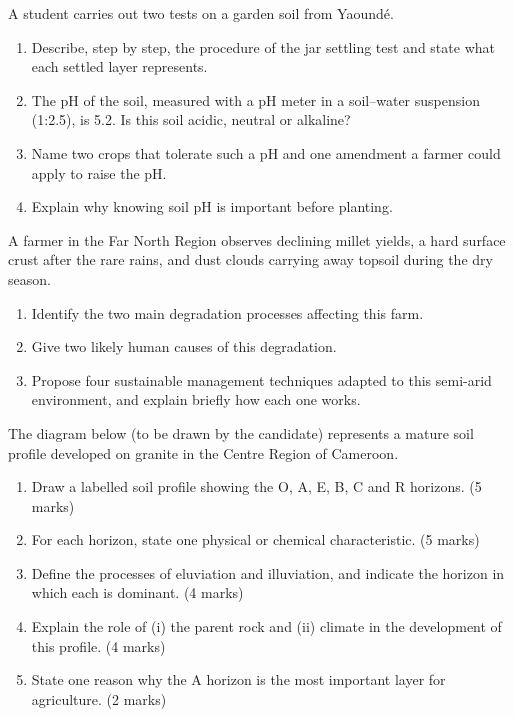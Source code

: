 \documentclass[11pt]{article}
\newcounter{popsec}
\newcounter{popsub}
\newcommand{\courssub}[1]{%
  \stepcounter{popsub}%
  \par\vspace{9pt}\noindent{\popxbold\fontsize{11.5}{13}\selectfont\color{popink}{\color{poporange}\thepopsec.\thepopsub}\hspace{6pt}#1}\par\nopagebreak\vspace{4pt}
}
\begin{document}
\begin{exercice}
A student carries out two tests on a garden soil from Yaoundé.
\begin{enumerate}
\item Describe, step by step, the procedure of the jar settling test and state what each settled layer represents.
\item The pH of the soil, measured with a pH meter in a soil--water suspension (1:2.5), is 5.2. Is this soil acidic, neutral or alkaline?
\item Name two crops that tolerate such a pH and one amendment a farmer could apply to raise the pH.
\item Explain why knowing soil pH is important before planting.
\end{enumerate}
\end{exercice}

\begin{exercice}
A farmer in the Far North Region observes declining millet yields, a hard surface crust after the rare rains, and dust clouds carrying away topsoil during the dry season.
\begin{enumerate}
\item Identify the two main degradation processes affecting this farm.
\item Give two likely human causes of this degradation.
\item Propose four sustainable management techniques adapted to this semi-arid environment, and explain briefly how each one works.
\end{enumerate}
\end{exercice}

\courssub{I prepare for the GCE}

\begin{exercice}
The diagram below (to be drawn by the candidate) represents a mature soil profile developed on granite in the Centre Region of Cameroon.
\begin{enumerate}
\item Draw a labelled soil profile showing the O, A, E, B, C and R horizons. \hfill (5 marks)
\item For each horizon, state one physical or chemical characteristic. \hfill (5 marks)
\item Define the processes of eluviation and illuviation, and indicate the horizon in which each is dominant. \hfill (4 marks)
\item Explain the role of (i) the parent rock and (ii) climate in the development of this profile. \hfill (4 marks)
\item State one reason why the A horizon is the most important layer for agriculture. \hfill (2 marks)
\end{enumerate}
\end{exercice}
\end{document}
